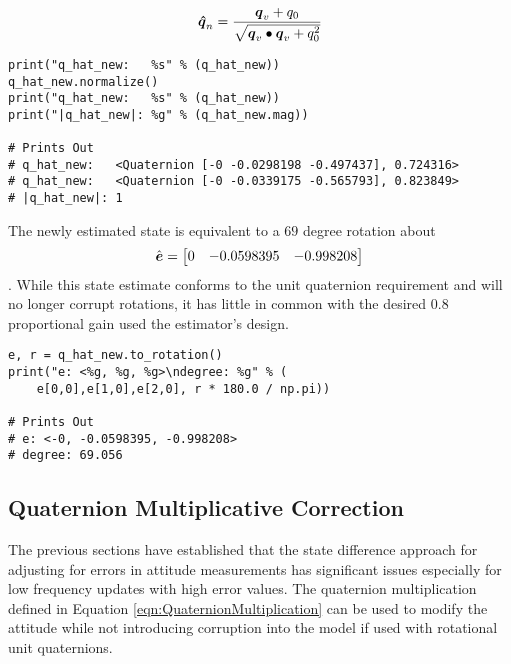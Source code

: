 \begin{equation}
  \boldsymbol{\hat{q}}_n = \frac{\boldsymbol{q}_v + q_0}{\sqrt{\boldsymbol{q}_v \bullet \boldsymbol{q}_v + q_0^2}}
  \label{eqn:NormalizeQuaternion}
\end{equation}

\begin{singlespace}
  \begin{verbatim}
print("q_hat_new:   %s" % (q_hat_new))
q_hat_new.normalize()
print("q_hat_new:   %s" % (q_hat_new))
print("|q_hat_new|: %g" % (q_hat_new.mag))

# Prints Out
# q_hat_new:   <Quaternion [-0 -0.0298198 -0.497437], 0.724316>
# q_hat_new:   <Quaternion [-0 -0.0339175 -0.565793], 0.823849>
# |q_hat_new|: 1
  \end{verbatim}
\nocite{minted}
\end{singlespace}

The newly estimated state is equivalent to a $69$ degree rotation about
\begin{equation}\hat{\boldsymbol{e}} = \begin{bmatrix} 0 & -0.0598395 & -0.998208 \end{bmatrix}\end{equation}.  While this state estimate conforms to the unit quaternion requirement and will no longer corrupt rotations, it has little in common with the desired $0.8$ proportional gain used the estimator's design.

\begin{singlespace}
  \begin{verbatim}
e, r = q_hat_new.to_rotation()
print("e: <%g, %g, %g>\ndegree: %g" % (
    e[0,0],e[1,0],e[2,0], r * 180.0 / np.pi))

# Prints Out
# e: <-0, -0.0598395, -0.998208>
# degree: 69.056
  \end{verbatim}
\nocite{minted}
\end{singlespace}


\subsection{Quaternion Multiplicative Correction}
\label{subsec:QuaternionMultiplicativeCorrection}

The previous sections have established that the state difference approach for adjusting for errors in attitude measurements has significant issues especially for low frequency updates with high error values.  The quaternion multiplication defined in Equation \ref{eqn:QuaternionMultiplication} can be used to modify the attitude while not introducing corruption into the model if used with rotational unit quaternions.

